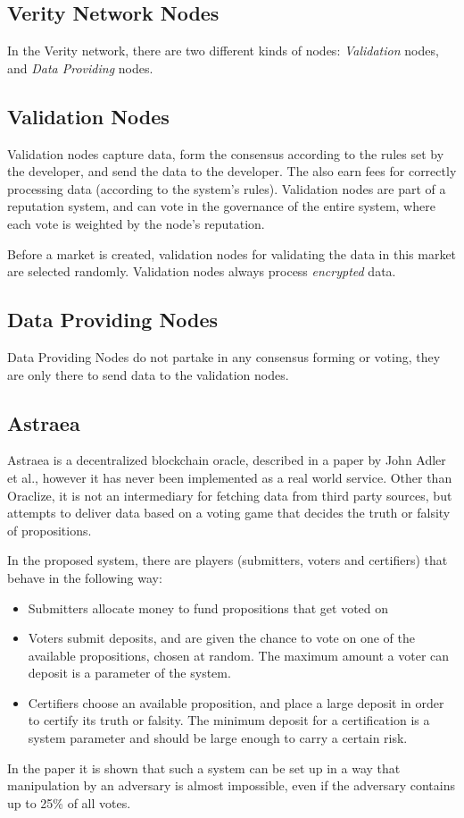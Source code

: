 \subsection*{Verity Network Nodes}
In the Verity network, there are two different kinds of nodes: \emph{Validation} nodes, and \emph{Data Providing} nodes.

\subsection*{Validation Nodes}
Validation nodes capture data, form the consensus according to the rules set by the developer, and send the data to the developer. The also earn fees for correctly processing data (according to the system's rules). Validation nodes are part of a reputation system, and can vote in the governance of the entire system, where each vote is weighted by the node's reputation.

Before a market is created, validation nodes for validating the data in this market are selected randomly. Validation nodes always process \emph{encrypted} data\cite{veritywhitepaper}.

\subsection*{Data Providing Nodes}
Data Providing Nodes do not partake in any consensus forming or voting, they are only there to send data to the validation nodes.

\subsection{Astraea}
Astraea is a decentralized blockchain oracle, described in a paper by John Adler et al.\cite{astraea}, however it has never been implemented as a real world service. Other than Oraclize, it is not an intermediary for fetching data from third party sources, but attempts to deliver data based on a voting game that decides the truth or falsity of propositions.

In the proposed system, there are players (submitters, voters and certifiers) that behave in the following way:
\begin{itemize}
	\item Submitters allocate money to fund propositions that get voted on
	\item Voters submit deposits, and are given the chance to vote on one of the available propositions, chosen at random. The maximum amount a voter can deposit is a parameter of the system.
	\item Certifiers choose an available proposition, and place a large deposit in order to certify its truth or falsity. The minimum deposit for a certification is a system parameter and should be large enough to carry a certain risk.
\end{itemize}
In the paper it is shown that such a system can be set up in a way that manipulation by an adversary is almost impossible, even if the adversary contains up to 25\% of all votes\cite{astraea}.

